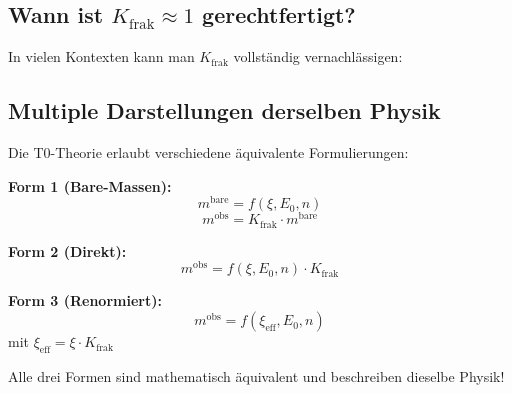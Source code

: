 	\subsection{Wann ist $K_{\text{frak}} \approx 1$ gerechtfertigt?}
	
	In vielen Kontexten kann man $K_{\text{frak}}$ vollständig vernachlässigen:
	
	\begin{table}[h]
		\centering
		\caption{Berechtigung der Vernachlässigung von $K_{\text{frak}}$}
	\end{table}
	
	\subsection{Multiple Darstellungen derselben Physik}
	
	Die T0-Theorie erlaubt verschiedene äquivalente Formulierungen:
	
	\textbf{Form 1 (Bare-Massen):}
	\begin{equation}
		m^{\text{bare}} = f(\xi, E_0, n)
	\end{equation}
	\begin{equation}
		m^{\text{obs}} = K_{\text{frak}} \cdot m^{\text{bare}}
	\end{equation}
	
	\textbf{Form 2 (Direkt):}
	\begin{equation}
		m^{\text{obs}} = f(\xi, E_0, n) \cdot K_{\text{frak}}
	\end{equation}
	
	\textbf{Form 3 (Renormiert):}
	\begin{equation}
		m^{\text{obs}} = f(\xi_{\text{eff}}, E_0, n)
	\end{equation}
	mit $\xi_{\text{eff}} = \xi \cdot K_{\text{frak}}$
	
	Alle drei Formen sind mathematisch äquivalent und beschreiben dieselbe Physik!
	
